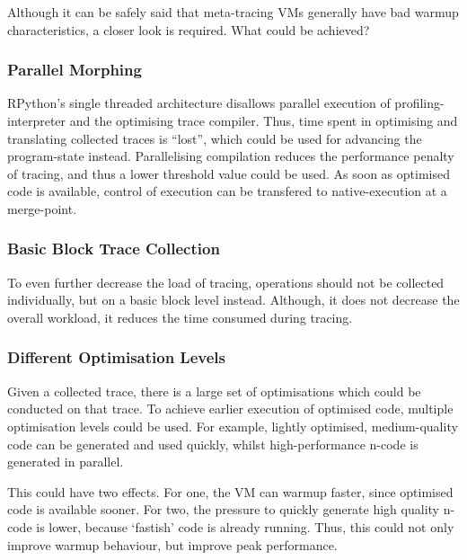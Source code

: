 Although it can be safely said that meta-tracing VMs generally have bad warmup
characteristics, a closer look is required. What could be achieved?



\subsubsection{Parallel Morphing} RPython's single threaded architecture disallows
parallel execution of profiling-interpreter and the optimising trace compiler.
Thus, time spent in optimising and translating collected traces is ``lost'',
which could be used for advancing the program-state instead. Parallelising
compilation reduces the performance penalty of tracing, and thus a lower
threshold value could be used. As soon as optimised code is available, control
of execution can be transfered to native-execution at a merge-point.

\subsubsection{Basic Block Trace Collection} To even further decrease the load of
tracing, operations should not be collected individually, but on a basic block
level instead. Although, it does not decrease the overall workload, it reduces
the time consumed during tracing.

\subsubsection{Different Optimisation Levels}

Given a collected trace, there is a large set of optimisations which could be
conducted on that trace. To achieve earlier execution of
optimised code, multiple optimisation levels could be used. For example,
lightly optimised, medium-quality code can be generated and used quickly, whilst
high-performance n-code is generated in parallel.

This could have two effects. For one, the VM can warmup faster, since optimised
code is available sooner. For two, the pressure to quickly generate high quality
n-code is lower, because `fastish' code is already running. Thus, this could not
only improve warmup behaviour, but improve peak performance.

